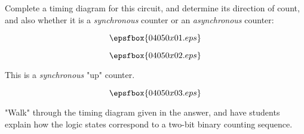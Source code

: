 

Complete a timing diagram for this circuit, and determine its direction of count, and also whether it is a {\it synchronous} counter or an {\it asynchronous} counter:

$$\epsfbox{04050x01.eps}$$

$$\epsfbox{04050x02.eps}$$







This is a {\it synchronous} "up" counter.

$$\epsfbox{04050x03.eps}$$







"Walk" through the timing diagram given in the answer, and have students explain how the logic states correspond to a two-bit binary counting sequence.




